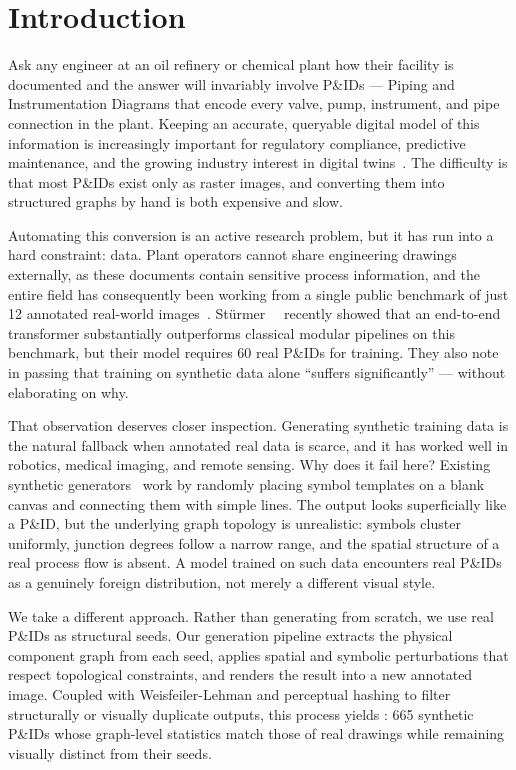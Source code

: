 \section{Introduction}
\label{sec:intro}

Ask any engineer at an oil refinery or chemical plant how their facility
is documented and the answer will invariably involve P\&IDs ---
Piping and Instrumentation Diagrams that encode every valve, pump,
instrument, and pipe connection in the plant.
Keeping an accurate, queryable digital model of this information is
increasingly important for regulatory compliance, predictive maintenance,
and the growing industry interest in digital
twins~\cite{toghraei2019}.
The difficulty is that most P\&IDs exist only as raster images, and
converting them into structured graphs by hand is both expensive and slow.

Automating this conversion is an active research problem, but it has run
into a hard constraint: data.
Plant operators cannot share engineering drawings externally, as these
documents contain sensitive process information, and the entire field has
consequently been working from a single public benchmark of just 12
annotated real-world images~\cite{sturmer2025}.
Stürmer~\etal~\cite{sturmer2025} recently showed that an end-to-end
transformer substantially outperforms classical modular pipelines on this
benchmark, but their model requires 60 real P\&IDs for training.
They also note in passing that training on synthetic data alone
``suffers significantly'' --- without elaborating on why.

That observation deserves closer inspection.
Generating synthetic training data is the natural fallback when
annotated real data is scarce, and it has worked well in robotics,
medical imaging, and remote sensing.
Why does it fail here?
Existing synthetic generators~\cite{paliwal2021,sturmer2025} work by
randomly placing symbol templates on a blank canvas and connecting them
with simple lines.
The output looks superficially like a P\&ID, but the underlying graph
topology is unrealistic: symbols cluster uniformly, junction degrees
follow a narrow range, and the spatial structure of a real process flow
is absent.
A model trained on such data encounters real P\&IDs as a genuinely
foreign distribution, not merely a different visual style.

We take a different approach.
Rather than generating from scratch, we use real P\&IDs as structural
seeds.
Our generation pipeline extracts the physical component graph from each
seed, applies spatial and symbolic perturbations that respect topological
constraints, and renders the result into a new annotated image.
Coupled with Weisfeiler-Lehman and perceptual hashing to filter
structurally or visually duplicate outputs, this process yields \ours{}:
665 synthetic P\&IDs whose graph-level statistics match those of real
drawings while remaining visually distinct from their seeds.

